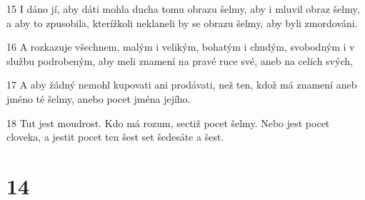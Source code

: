 \par 15 I dáno jí, aby dáti mohla ducha tomu obrazu šelmy, aby i mluvil obraz šelmy, a aby to zpusobila, kterížkoli neklaneli by se obrazu šelmy, aby byli zmordováni.
\par 16 A rozkazuje všechnem, malým i velikým, bohatým i chudým, svobodným i v službu podrobeným, aby meli znamení na pravé ruce své, aneb na celích svých,
\par 17 A aby žádný nemohl kupovati ani prodávati, než ten, kdož má znamení aneb jméno té šelmy, anebo pocet jména jejího.
\par 18 Tut jest moudrost. Kdo má rozum, sectiž pocet šelmy. Nebo jest pocet cloveka, a jestit pocet ten šest set šedesáte a šest.

\chapter{14}

